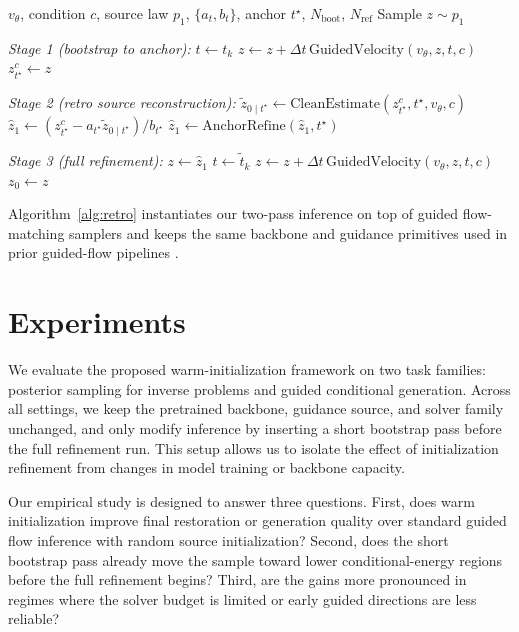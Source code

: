 \documentclass[letterpaper]{article} %
\begin{document}
\begin{algorithm}[t]
\caption{Algorithm of Retro Warm-Initialized Guided Flow Inference}
\label{alg:retro}
\begin{algorithmic}[1]
\REQUIRE $v_\theta$, condition $c$, source law $p_1$, $\{a_t,b_t\}$, anchor $t^\star$, $N_{\mathrm{boot}}$, $N_{\mathrm{ref}}$
\STATE Sample $z \sim p_1$

\STATE \textit{Stage 1 (bootstrap to anchor):}
    \STATE $t \leftarrow t_k$
    \STATE $z \leftarrow z + \Delta t\,\mathrm{GuidedVelocity}(v_\theta,z,t,c)$
\ENDFOR
\STATE $z_{t^\star}^{c} \leftarrow z$

\STATE \textit{Stage 2 (retro source reconstruction):}
\STATE $\tilde z_{0\mid t^\star} \leftarrow \mathrm{CleanEstimate}(z_{t^\star}^{c},t^\star,v_\theta,c)$
\STATE $\hat z_1 \leftarrow (z_{t^\star}^{c}-a_{t^\star}\tilde z_{0\mid t^\star})/b_{t^\star}$
\STATE $\hat z_1 \leftarrow \mathrm{AnchorRefine}(\hat z_1,t^\star)$

\STATE \textit{Stage 3 (full refinement):}
\STATE $z \leftarrow \hat z_1$
    \STATE $t \leftarrow \tilde t_k$
    \STATE $z \leftarrow z + \Delta t\,\mathrm{GuidedVelocity}(v_\theta,z,t,c)$
\ENDFOR
\RETURN $z_0 \leftarrow z$
\end{algorithmic}
\end{algorithm}

Algorithm~\ref{alg:retro} instantiates our two-pass inference on top of guided flow-matching samplers and keeps the same backbone and guidance primitives used in prior guided-flow pipelines \citep{flowdps2024,cfgzero2024}.

\section{Experiments}

We evaluate the proposed warm-initialization framework on two task families: posterior sampling for inverse problems and guided conditional generation. Across all settings, we keep the pretrained backbone, guidance source, and solver family unchanged, and only modify inference by inserting a short bootstrap pass before the full refinement run. This setup allows us to isolate the effect of initialization refinement from changes in model training or backbone capacity.

Our empirical study is designed to answer three questions. First, does warm initialization improve final restoration or generation quality over standard guided flow inference with random source initialization? Second, does the short bootstrap pass already move the sample toward lower conditional-energy regions before the full refinement begins? Third, are the gains more pronounced in regimes where the solver budget is limited or early guided directions are less reliable?
\end{document}
